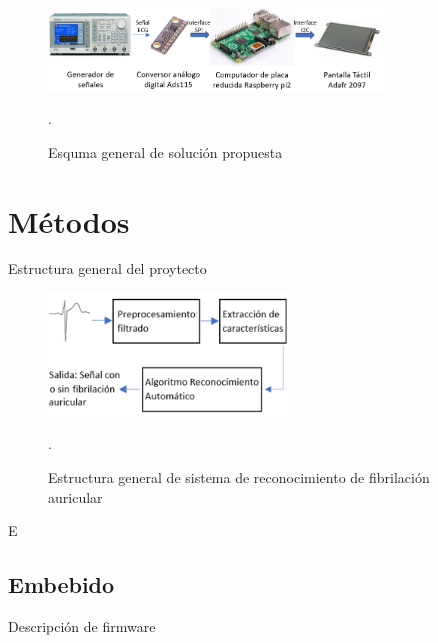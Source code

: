 \documentclass[journal]{IEEEtran}
\begin{document}



\begin{figure}[!h]
	\centering
	\includegraphics[width=3.5in]{hardware_partes.png}
	\caption{Esquma general de solución propuesta}.
	\label{hardware}
\end{figure}


\section{Métodos}


Estructura general del proytecto

\begin{figure}[!h]
	\centering
	\includegraphics[width=2.5in]{estructura_general}
	\caption{Estructura general de sistema de reconocimiento de fibrilación auricular}.
	\label{estructura_general}
\end{figure}

E 

\subsection{Embebido}
Descripción de firmware 
\end{document}
